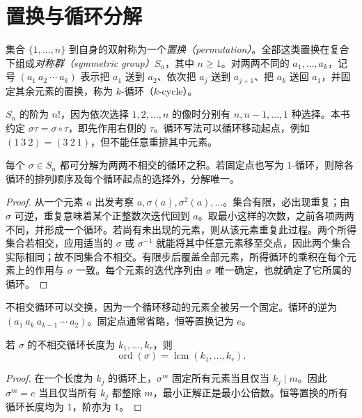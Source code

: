 \section{置换与循环分解}\label{sec:permutation-cycles}

\begin{definition}[对称群与循环]
集合 $\{1,\ldots,n\}$ 到自身的双射称为一个\emph{置换（permutation）}。全部这类置换在复合下组成\emph{对称群（symmetric group）}$S_n$，其中 $n\geq1$。对两两不同的 $a_1,\ldots,a_k$，记号 $(a_1\ a_2\ \cdots\ a_k)$ 表示把 $a_1$ 送到 $a_2$、依次把 $a_j$ 送到 $a_{j+1}$、把 $a_k$ 送回 $a_1$，并固定其余元素的置换，称为 $k$-循环（$k$-cycle）。
\end{definition}

$S_n$ 的阶为 $n!$，因为依次选择 $1,2,\ldots,n$ 的像时分别有 $n,n-1,\ldots,1$ 种选择。本书约定 $\sigma\tau=\sigma\circ\tau$，即先作用右侧的 $\tau$。循环写法可以循环移动起点，例如 $(1\ 3\ 2)=(3\ 2\ 1)$，但不能任意重排其中元素。

\begin{theorem}[不相交循环分解]\label{thm:disjoint-cycles}
每个 $\sigma\in S_n$ 都可分解为两两不相交的循环之积。若固定点也写为 $1$-循环，则除各循环的排列顺序及每个循环起点的选择外，分解唯一。
\end{theorem}
\begin{proof}
从一个元素 $a$ 出发考察 $a,\sigma(a),\sigma^2(a),\ldots$。集合有限，必出现重复；由 $\sigma$ 可逆，重复意味着某个正整数次迭代回到 $a$。取最小这样的次数，之前各项两两不同，并形成一个循环。若尚有未出现的元素，则从该元素重复此过程。两个所得集合若相交，应用适当的 $\sigma$ 或 $\sigma^{-1}$ 就能将其中任意元素移至交点，因此两个集合实际相同；故不同集合不相交。有限步后覆盖全部元素，所得循环的乘积在每个元素上的作用与 $\sigma$ 一致。每个元素的迭代序列由 $\sigma$ 唯一确定，也就确定了它所属的循环。
\end{proof}

不相交循环可以交换，因为一个循环移动的元素全被另一个固定。循环的逆为 $(a_1\ a_k\ a_{k-1}\ \cdots\ a_2)$。固定点通常省略，恒等置换记为 $e$。

\begin{proposition}[置换的阶]\label{prop:permutation-order}
若 $\sigma$ 的不相交循环长度为 $k_1,\ldots,k_r$，则
\[
  \operatorname{ord}(\sigma)=\operatorname{lcm}(k_1,\ldots,k_r).
\]
\end{proposition}
\begin{proof}
在一个长度为 $k_j$ 的循环上，$\sigma^m$ 固定所有元素当且仅当 $k_j\mid m$。因此 $\sigma^m=e$ 当且仅当所有 $k_j$ 都整除 $m$，最小正解正是最小公倍数。恒等置换的所有循环长度均为 $1$，阶亦为 $1$。
\end{proof}

